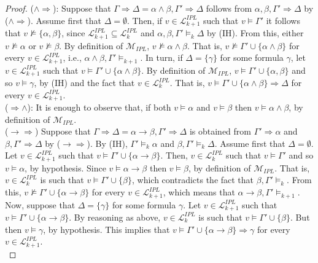 \documentclass[12pt]{article}
\begin{document}
\begin{proof}
($\wedge\Rightarrow$): Suppose that $\Gamma \Rightarrow\Delta=\alpha \land \beta,\Gamma' \Rightarrow\Delta$ follows from $\alpha, \beta,\Gamma'\Rightarrow\Delta$ by ($\wedge\Rightarrow$). Assume first that $\Delta=\emptyset$. Then, if $v \in \mathcal{L}_{k+1}^{IPL}$ such that $v \models\Gamma'$  it follows that $v \not\models\{\alpha,\beta\}$, since $\mathcal{L}_{k+1}^{IPL} \subseteq \mathcal{L}_k^{IPL}$ and $\alpha, \beta,\Gamma'\models_{k}\Delta$ by (IH). From this, either  $v \not\models\alpha$ or  $v \not\models\beta$. By definition of $\mathcal{M}_{IPL}$,  $v \not\models\alpha \land\beta$. That is, $v \not\models\Gamma' \cup \{\alpha\land\beta\}$ for every $v\in \mathcal{L}_{k+1}^{IPL}$, i.e., $\alpha\wedge\beta, \Gamma'\models_{k+1}$. In turn, if  $\Delta=\{\gamma\}$ for some formula $\gamma$, let $v \in \mathcal{L}_{k+1}^{IPL}$ such that $v \models\Gamma' \cup \{\alpha\land\beta\}$. By definition of $\mathcal{M}_{IPL}$, $v \models\Gamma' \cup \{\alpha,\beta\}$ and so $v\models\gamma$, by (IH) and the fact that  $v \in \mathcal{L}_k^{IPL}$. That is, $v\models \Gamma' \cup \{\alpha \land\beta\}\Rightarrow\Delta$ for every $v\in \mathcal{L}_{k+1}^{IPL}$.\\[1mm]
%
($\Rightarrow\wedge$): It is enough to observe that, if both $v\models \alpha$ and $v\models \beta$ then $v\models \alpha\wedge\beta$, by definition of $\mathcal{M}_{IPL}$.\\[1mm]
%
($\to\Rightarrow$) Suppose that $\Gamma \Rightarrow\Delta= \alpha \to \beta,\Gamma'\Rightarrow \Delta$ is obtained from $\Gamma' \Rightarrow \alpha$ and $\beta, \Gamma' \Rightarrow\Delta$ by ($\to\Rightarrow$). By (IH),  $\Gamma'\models_{k} \alpha$ and $\beta, \Gamma' \models_{k}\Delta$. Assume first that $\Delta=\emptyset$. Let $v \in \mathcal{L}_{k+1}^{IPL}$ such that $v \models\Gamma' \cup\{\alpha \to \beta\}$. Then, $v  \in \mathcal{L}_{k}^{IPL}$ such that $v \models\Gamma'$ and so $v\models \alpha$, by hypothesis. Since $v \models\alpha \to \beta$ then  $v \models \beta$, by definition of  $\mathcal{M}_{IPL}$. That is, $v  \in \mathcal{L}_{k}^{IPL}$ is such that $v \models\Gamma'\cup \{\beta\}$, which contradicts the fact that $\beta, \Gamma' \models_{k}$. From this,  $v \not\models\Gamma' \cup\{\alpha \to \beta\}$ for every $v \in \mathcal{L}_{k+1}^{IPL}$, which means that $\alpha \to\beta,\Gamma'\models_{k+1}$. Now, suppose that $\Delta=\{\gamma\}$ for some formula $\gamma$.  Let $v \in \mathcal{L}_{k+1}^{IPL}$ such that $v \models\Gamma' \cup\{\alpha \to \beta\}$. By reasoning as above,   $v  \in \mathcal{L}_{k}^{IPL}$ is such that $v \models\Gamma'\cup \{\beta\}$. But then $v \models \gamma$, by hypothesis. This implies that $v \models\Gamma' \cup\{\alpha \to \beta\} \Rightarrow \gamma$ for every $v \in \mathcal{L}_{k+1}^{IPL}$. \\[1mm]

\end{proof}
\end{document}
